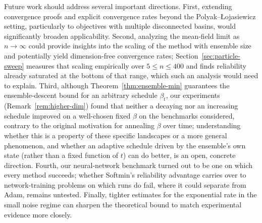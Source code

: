 \documentclass{article} %
\theoremstyle{plain}
\theoremstyle{definition}
\theoremstyle{remark}
\begin{document}
Future work should address several important directions. First, extending convergence proofs and explicit convergence rates beyond the Polyak--\L{}ojasiewicz setting, particularly to objectives with multiple disconnected basins, would significantly broaden applicability. Second, analyzing the mean-field limit as $n \to \infty$ could provide insights into the scaling of the method with ensemble size and potentially yield dimension-free convergence rates; Section~\ref{sec:particle-sweep} measures that scaling empirically over $5\leq n\leq400$ and finds reliability already saturated at the bottom of that range, which such an analysis would need to explain. Third, although Theorem~\ref{thm:ensemble-min} guarantees the ensemble-descent bound for an arbitrary schedule $\beta_t$, our experiments (Remark~\ref{rem:higher-dim}) found that neither a decaying nor an increasing schedule improved on a well-chosen fixed $\beta$ on the benchmarks considered, contrary to the original motivation for annealing $\beta$ over time; understanding whether this is a property of these specific landscapes or a more general phenomenon, and whether an adaptive schedule driven by the ensemble's own state (rather than a fixed function of $t$) can do better, is an open, concrete direction. Fourth, our neural-network benchmark turned out to be one on which every method succeeds; whether Softmin's reliability advantage carries over to network-training problems on which runs do fail, where it could separate from Adam, remains untested. Finally, tighter estimates for the exponential rate in the small noise regime can sharpen the theoretical bound to match experimental evidence more closely.
\end{document}
